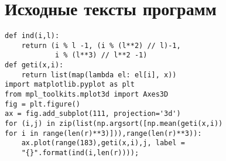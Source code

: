 \chapter*{Исходные тексты программ}

\begin{lstlisting}
def ind(i,l):
    return (i % l -1, (i % (l**2) // l)-1,
            i % (l**3) // l**2 -1)	
def geti(x,i):
    return list(map(lambda el: el[i], x))		
import matplotlib.pyplot as plt
from mpl_toolkits.mplot3d import Axes3D
fig = plt.figure()
ax = fig.add_subplot(111, projection='3d')	
for (i,j) in zip(list(np.argsort([np.mean(geti(x,i)) 
for i in range(len(r)**3)])),range(len(r)**3)):
    ax.plot(range(183),geti(x,i),j, label =
    "{}".format(ind(i,len(r))));
\end{lstlisting}
